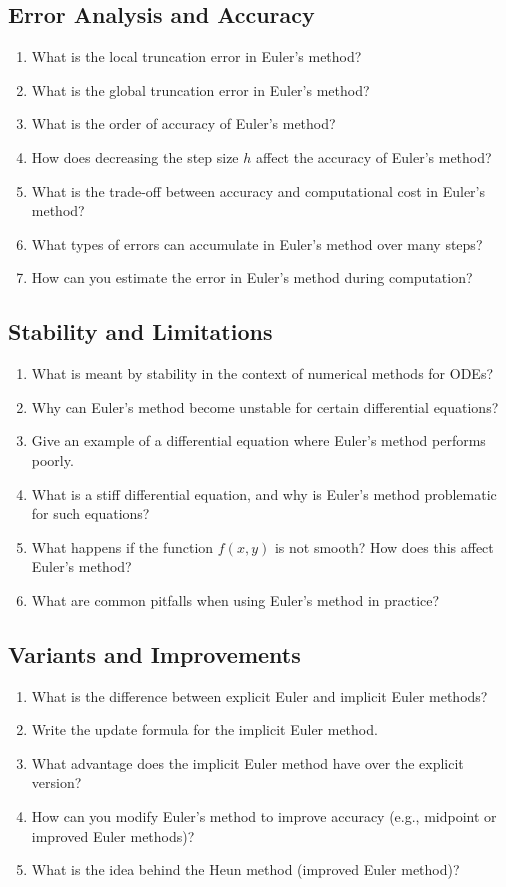 \subsection{Error Analysis and Accuracy}
\begin{enumerate}[resume]
  \item What is the local truncation error in Euler's method?
  \item What is the global truncation error in Euler's method?
  \item What is the order of accuracy of Euler's method?
  \item How does decreasing the step size \(h\) affect the accuracy of Euler's method?
  \item What is the trade-off between accuracy and computational cost in Euler's method?
  \item What types of errors can accumulate in Euler's method over many steps?
  \item How can you estimate the error in Euler's method during computation?
\end{enumerate}

\subsection{Stability and Limitations}
\begin{enumerate}[resume]
  \item What is meant by stability in the context of numerical methods for ODEs?
  \item Why can Euler's method become unstable for certain differential equations?
  \item Give an example of a differential equation where Euler's method performs poorly.
  \item What is a stiff differential equation, and why is Euler's method problematic for such equations?
  \item What happens if the function \(f(x,y)\) is not smooth? How does this affect Euler's method?
  \item What are common pitfalls when using Euler's method in practice?
\end{enumerate}

\subsection{Variants and Improvements}
\begin{enumerate}[resume]
  \item What is the difference between explicit Euler and implicit Euler methods?
  \item Write the update formula for the implicit Euler method.
  \item What advantage does the implicit Euler method have over the explicit version?
  \item How can you modify Euler's method to improve accuracy (e.g., midpoint or improved Euler methods)?
  \item What is the idea behind the Heun method (improved Euler method)?
\end{enumerate}

